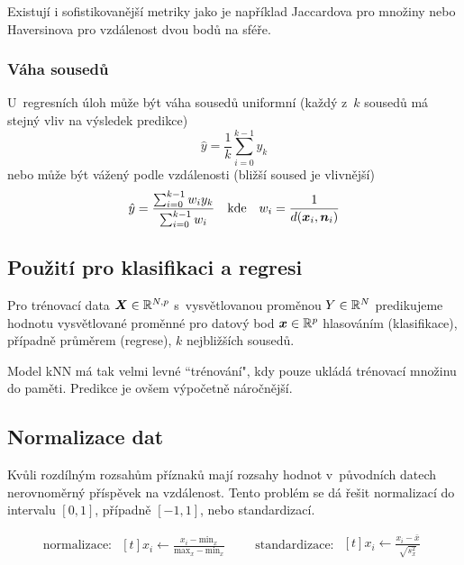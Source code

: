 Existují i sofistikovanější metriky jako je například Jaccardova pro množiny nebo Haversinova pro vzdálenost dvou bodů na sféře.

\subsubsection{Váha sousedů}

U~regresních úloh může být váha sousedů uniformní (každý z~$k$ sousedů má stejný vliv na výsledek predikce)
\[
    \hat{y} = \frac{1}{k} \sum_{i=0}^{k-1} y_k
\]
nebo může být vážený podle vzdálenosti (bližší soused je vlivnější)
\begin{equation*}
    \begin{aligned}[t]
        \hat{y} = \frac{\sum_{i=0}^{k-1} w_i y_k}{\sum_{i=0}^{k-1} w_i}
    \end{aligned}
    \quad \text{kde} \quad
    \begin{aligned}[t]
        w_i = \frac{1}{d(\bm{x}_i, \bm{n}_i)}
    \end{aligned}
\end{equation*}

\subsection{Použití pro klasifikaci a regresi}

Pro trénovací data $\bm{X} \in \mathbb{R}^{N, p}$ s~vysvětlovanou proměnou $Y \in \mathbb{R}^N$ predikujeme hodnotu vysvětlované proměnné pro datový bod $\bm{x} \in \mathbb{R}^p$ hlasováním (klasifikace), případně průměrem (regrese), $k$ nejbližších sousedů.

Model kNN má tak velmi levné ``trénování", kdy pouze ukládá trénovací množinu do paměti. Predikce je ovšem výpočetně náročnější.

\subsection{Normalizace dat}

Kvůli rozdílným rozsahům příznaků mají rozsahy hodnot v~původních datech nerovnoměrný příspěvek na vzdálenost. Tento problém se dá řešit normalizací do intervalu $[0,1]$, případně $[-1, 1]$, nebo standardizací.

\begin{equation*}
    \text{normalizace: }
    \begin{aligned}[t]
        x_i \leftarrow \frac{x_i - \text{min}_x}{\text{max}_x - \text{min}_x}
    \end{aligned}
    \quad\quad
    \text{standardizace: }
    \begin{aligned}[t]
        x_i \leftarrow \frac{x_i - \bar{x}}{\sqrt{s_x^2}}
    \end{aligned}
\end{equation*}

